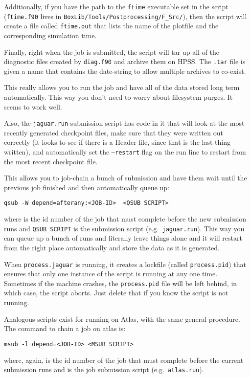 Additionally, if you have the path to the {\tt ftime} executable set in the
script ({\tt ftime.f90} lives in {\tt BoxLib/Tools/Postprocessing/F\_Src/}), then the
script will create a file called {\tt ftime.out} that lists the name of the
plotfile and the corresponding simulation time.

Finally, right when the job is submitted, the script will tar up all
of the diagnostic files created by {\tt diag.f90} and archive them on HPSS.
The {\tt .tar} file is given a name that contains the date-string to allow
multiple archives to co-exist.

This really allows you to run the job and have all of the data stored
long term automatically.  This way you don't need to worry about
filesystem purges.  It seems to work well.

Also, the {\tt jaguar.run} submission script has code in it that will look
at the most recently generated checkpoint files, make sure that they
were written out correctly (it looks to see if there is a Header file,
since that is the last thing written), and automatically set the
{\tt --restart} flag on the run line to restart from the most recent
checkpoint file.

This allows you to job-chain a bunch of submission and have them wait
until the previous job finished and then automatically queue up:
\begin{verbatim}
qsub -W depend=afterany:<JOB-ID>  <QSUB SCRIPT>
\end{verbatim}
where {\tt <JOB-ID>} is the id number of the job that must complete
before the new submission runs and {\tt QSUB SCRIPT} is the submission
script (e.g.\ {\tt jaguar.run}).
This way you can queue up a bunch of runs and literally leave things
alone and it will restart from the right place automatically and store
the data as it is generated.

When {\tt process.jaguar} is running, it creates a lockfile (called
{\tt process.pid}) that ensures that only one instance of the script
is running at any one time.  Sometimes if the machine crashes, the
{\tt process.pid} file will be left behind, in which case, the script
aborts.  Just delete that if you know the script is not running.

Analogous scripts exist for running on Atlas, with the same general
procedure.  The command to chain a job on atlas is:
\begin{verbatim}
msub -l depend=<JOB-ID> <MSUB SCRIPT>
\end{verbatim}
where, again, {\tt <JOB-ID>} is the id number of the job that must
complete before the current submission runs and {\tt <MSUB SCRIPT>}
is the job submission script (e.g.\ {\tt atlas.run}).


